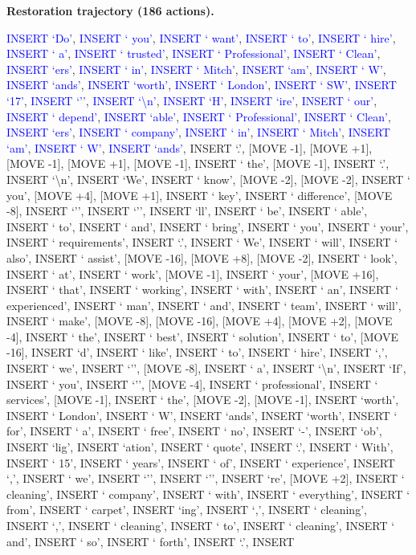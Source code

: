 \documentclass[11pt]{article}
\begin{document}
\vspace{0.4em}
\textbf{Restoration trajectory (186 actions).}\par
{
\ttfamily\scriptsize\raggedright\setlength{\parindent}{0pt}
\textcolor{blue}{INSERT `Do'}, \textcolor{blue}{INSERT ` you'}, \textcolor{blue}{INSERT ` want'}, \textcolor{blue}{INSERT ` to'}, \textcolor{blue}{INSERT ` hire'}, \textcolor{blue}{INSERT ` a'}, \textcolor{blue}{INSERT ` trusted'}, \textcolor{blue}{INSERT ` Professional'}, \textcolor{blue}{INSERT ` Clean'}, \textcolor{blue}{INSERT `ers'}, \textcolor{blue}{INSERT ` in'}, \textcolor{blue}{INSERT ` Mitch'}, \textcolor{blue}{INSERT `am'}, \textcolor{blue}{INSERT ` W'}, \textcolor{blue}{INSERT `ands'}, \textcolor{blue}{INSERT `worth'}, \textcolor{blue}{INSERT ` London'}, \textcolor{blue}{INSERT ` SW'}, \textcolor{blue}{INSERT `17'}, \textcolor{blue}{INSERT `''}, \textcolor{blue}{INSERT `\textbackslash{}n'}, \textcolor{blue}{INSERT `H'}, \textcolor{blue}{INSERT `ire'}, \textcolor{blue}{INSERT ` our'}, \textcolor{blue}{INSERT ` depend'}, \textcolor{blue}{INSERT `able'}, \textcolor{blue}{INSERT ` Professional'}, \textcolor{blue}{INSERT ` Clean'}, \textcolor{blue}{INSERT `ers'}, \textcolor{blue}{INSERT ` company'}, \textcolor{blue}{INSERT ` in'}, \textcolor{blue}{INSERT ` Mitch'}, \textcolor{blue}{INSERT `am'}, \textcolor{blue}{INSERT ` W'}, \textcolor{blue}{INSERT `ands'}, INSERT `.', [MOVE -1], [MOVE +1], [MOVE -1], [MOVE +1], [MOVE -1], INSERT ` the', [MOVE -1], INSERT `.', INSERT `\textbackslash{}n', INSERT `We', INSERT ` know', [MOVE -2], [MOVE -2], INSERT ` you', [MOVE +4], [MOVE +1], INSERT ` key', INSERT ` difference', [MOVE -8], INSERT `'', INSERT `'', INSERT `ll', INSERT ` be', INSERT ` able', INSERT ` to', INSERT ` and', INSERT ` bring', INSERT ` you', INSERT ` your', INSERT ` requirements', INSERT `.', INSERT ` We', INSERT ` will', INSERT ` also', INSERT ` assist', [MOVE -16], [MOVE +8], [MOVE -2], INSERT ` look', INSERT ` at', INSERT ` work', [MOVE -1], INSERT ` your', [MOVE +16], INSERT ` that', INSERT ` working', INSERT ` with', INSERT ` an', INSERT ` experienced', INSERT ` man', INSERT ` and', INSERT ` team', INSERT ` will', INSERT ` make', [MOVE -8], [MOVE -16], [MOVE +4], [MOVE +2], [MOVE -4], INSERT ` the', INSERT ` best', INSERT ` solution', INSERT ` to', [MOVE -16], INSERT `d', INSERT ` like', INSERT ` to', INSERT ` hire', INSERT `,', INSERT ` we', INSERT `'', [MOVE -8], INSERT ` a', INSERT `\textbackslash{}n', INSERT `If', INSERT ` you', INSERT `'', [MOVE -4], INSERT ` professional', INSERT ` services', [MOVE -1], INSERT ` the', [MOVE -2], [MOVE -1], INSERT `worth', INSERT ` London', INSERT ` W', INSERT `ands', INSERT `worth', INSERT ` for', INSERT ` a', INSERT ` free', INSERT ` no', INSERT `-', INSERT `ob', INSERT `lig', INSERT `ation', INSERT ` quote', INSERT `.', INSERT ` With', INSERT ` 15', INSERT ` years', INSERT ` of', INSERT ` experience', INSERT `,', INSERT ` we', INSERT `'', INSERT `'', INSERT `re', [MOVE +2], INSERT ` cleaning', INSERT ` company', INSERT ` with', INSERT ` everything', INSERT ` from', INSERT ` carpet', INSERT `ing', INSERT `,', INSERT ` cleaning', INSERT `,', INSERT ` cleaning', INSERT ` to', INSERT ` cleaning', INSERT ` and', INSERT ` so', INSERT ` forth', INSERT `.', INSERT }
\end{document}
